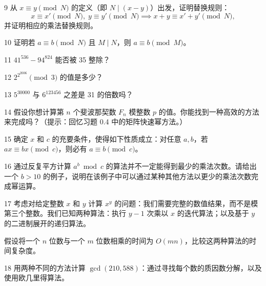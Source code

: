 \begin{exercise}{9}
从 $x \equiv y \pmod N$ 的定义（即 $N \mid (x - y)$）出发，证明替换规则：
\[
x \equiv x' \pmod N,\; y \equiv y' \pmod N \implies x + y \equiv x' + y' \pmod N,
\]
并证明相应的乘法替换规则。
\end{exercise}

\begin{exercise}{10}
证明若 $a \equiv b \pmod N$ 且 $M \mid N$，则 $a \equiv b \pmod M$。
\end{exercise}

\begin{exercise}{11}
$41^{536} - 94^{824}$ 能否被 35 整除？
\end{exercise}

\begin{exercise}{12}
$2^{2^{2006}} \pmod 3$ 的值是多少？
\end{exercise}

\begin{exercise}{13}
$5^{30000}$ 与 $6^{123456}$ 之差是 31 的倍数吗？
\end{exercise}

\begin{exercise}{14}
假设你想计算第 $n$ 个斐波那契数 $F_n$ 模整数 $p$ 的值。你能找到一种高效的方法来完成吗？（提示：回忆习题 0.4 中的矩阵快速幂方法。）
\end{exercise}

\begin{exercise}{15}
确定 $x$ 和 $c$ 的充要条件，使得如下性质成立：对任意 $a, b$，若 $ax \equiv bx \pmod c$，则必有 $a \equiv b \pmod c$。
\end{exercise}

\begin{exercise}{16}
通过反复平方计算 $a^b \bmod c$ 的算法并不一定能得到最少的乘法次数。请给出一个 $b > 10$ 的例子，说明在该例子中可以通过某种其他方法以更少的乘法次数完成幂运算。
\end{exercise}

\begin{exercise}{17}
考虑对给定整数 $x$ 和 $y$ 计算 $x^y$ 的问题：我们需要完整的数值结果，而不是模第三个整数。我们已知两种算法：执行 $y - 1$ 次乘以 $x$ 的迭代算法；以及基于 $y$ 的二进制展开的递归算法。

假设将一个 $n$ 位数与一个 $m$ 位数相乘的时间为 $O(mn)$，比较这两种算法的时间复杂度。
\end{exercise}

\begin{exercise}{18}
用两种不同的方法计算 $\gcd(210, 588)$：通过寻找每个数的质因数分解，以及使用欧几里得算法。
\end{exercise}

